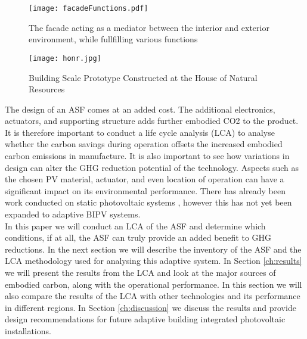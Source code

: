\begin{figure}[H]
\begin{center}
\texttt{[image: facadeFunctions.pdf]}
\caption{The facade acting as a mediator between the interior and exterior environment, while fullfilling various functions \cite{nagy2015frontiers}}
\label{fig:ASFschematic}
\end{center}
\end{figure}

\begin{figure}[H]
\begin{center}
\texttt{[image: honr.jpg]}
\caption{Building Scale Prototype Constructed at the House of Natural Resources \cite{nagy2015frontiers}}
\label{fig:HoNR}
\end{center}
\end{figure}

The design of an ASF comes at an added cost. The additional electronics, actuators, and supporting structure adds further embodied CO2 to the product. It is therefore important to conduct a life cycle analysis (LCA) to analyse whether the carbon savings during operation offsets the increased embodied carbon emissions in manufacture. It is also important to see how variations in design can alter the GHG reduction potential of the technology. Aspects such as the chosen PV material, actuator, and even location of operation can have a significant impact on its environmental performance. There has already been work conducted on static photovoltaic systems \cite{raugei2007life}, however this has not yet been expanded to adaptive BIPV systems. \\

In this paper we will conduct an LCA of the ASF and determine which conditions, if at all, the ASF can truly provide an added benefit to GHG reductions. In the next section we will describe the inventory of the ASF and the LCA methodology used for analysing this adaptive system. In Section \ref{ch:results} we will present the results from the LCA and look at the major sources of embodied carbon, along with the operational performance. In this section we will also compare the results of the LCA with other technologies and its performance in different regions. In Section \ref{ch:discussion} we discuss the results and provide design recommendations for future adaptive building integrated photovoltaic installations. 






